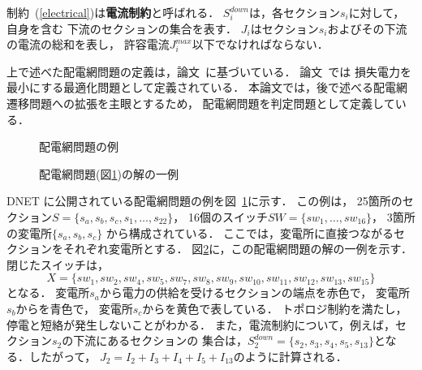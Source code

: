 制約~(\ref{electrical})は\textbf{電流制約}と呼ばれる．
$S_{i}^{down}$は，各セクション$s_{i}$に対して，自身を含む
下流のセクションの集合を表す．
$J_{i}$はセクション$s_{i}$およびその下流の電流の総和を表し，
許容電流$J_{i}^{max}$以下でなければならない．

上で述べた配電網問題の定義は，論文~\cite{Minato:dnet:ZDD}に基づいている．
論文~\cite{Minato:dnet:ZDD}では
損失電力を最小にする最適化問題として定義されている．
本論文では，後で述べる配電網遷移問題への拡張を主眼とするため，
配電網問題を判定問題として定義している．

\begin{figure}[tb]
 \centering
 \scalebox{0.6}{}
  \caption{配電網問題の例}
  \label{fig:test-input}
\end{figure}
%  
\begin{figure}[tb]
 \centering
 \scalebox{0.6}{}
 \caption{配電網問題(図\ref{fig:test-input})の解の一例}
 \label{fig:test-output}
\end{figure}

DNET
に公開されている配電網問題の例を図~\ref{fig:test-input}に示す．
この例は，
25箇所のセクション$S=\{s_{a},s_{b},s_{c},s_{1},\ldots, s_{22}\}$，
16個のスイッチ$SW=\{sw_{1},\ldots, sw_{16}\}$，
3箇所の変電所$\{s_{a}, s_{b}, s_{c}\}$
から構成されている．
ここでは，変電所に直接つながるセクションをそれぞれ変電所とする．
%
図\ref{fig:test-output}に，この配電網問題の解の一例を示す．
閉じたスイッチは，
\[X=\{sw_{1},sw_{2},sw_{4},sw_{5},sw_{7},sw_{8},sw_{9},%
sw_{10},sw_{11},sw_{12},sw_{13},sw_{15}\}\]
となる．
変電所$s_{a}$から電力の供給を受けるセクションの端点を赤色で，
変電所$s_{b}$からを青色で，
変電所$s_{c}$からを黄色で表している．
トポロジ制約を満たし，停電と短絡が発生しないことがわかる．
また，電流制約について，例えば，セクション$s_2$の下流にあるセクションの
集合は，$S_2^{down}=\{s_{2},s_{3},s_{4},s_{5},s_{13}\}$となる．したがって，
$J_{2}=I_{2}+I_{3}+I_{4}+I_{5}+I_{13}$のように計算される．



